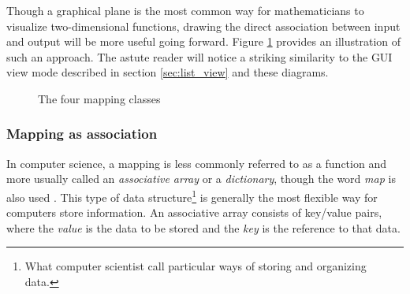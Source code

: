 Though a graphical plane is the most common way for mathematicians to visualize two-dimensional functions, drawing the direct association between input and output will be more useful going forward. Figure \ref{fig:types_of_mapping} provides an illustration of such an approach. The astute reader will notice a striking similarity to the GUI view mode described in section \ref{sec:list_view} and these diagrams.  

\begin{figure}[ht]
\centering
\caption{The four mapping classes}
\label{fig:types_of_mapping}
\end{figure}

	\subsubsection{Mapping as association}

In computer science, a mapping is less commonly referred to as a function and more usually called an \emph{associative array} or a \emph{dictionary}, though the word \emph{map} is also used \cite{data_structures}. This type of data structure\footnote{What computer scientist call particular ways of storing and organizing data.} is generally the most flexible way for computers store information. An associative array consists of key/value pairs, where the \emph{value} is the data to be stored and the \emph{key} is the reference to that data. 

